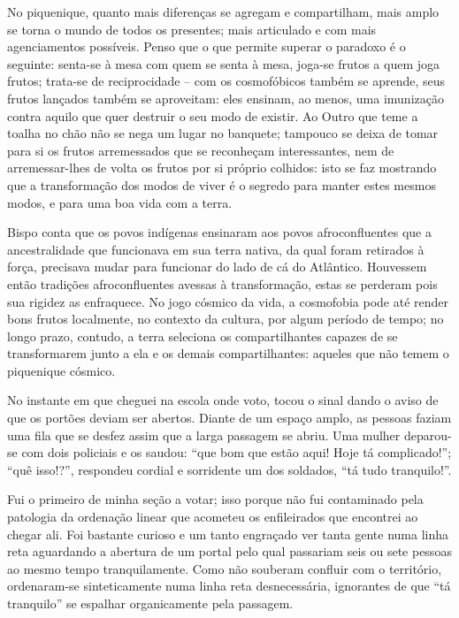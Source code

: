 No piquenique, quanto mais diferenças se agregam e compartilham, mais amplo se torna o mundo de todos os presentes; mais articulado e com mais agenciamentos possíveis. Penso que o que permite superar o paradoxo é o seguinte: senta-se à mesa com quem se senta à mesa, joga-se frutos a quem joga frutos; trata-se de reciprocidade -- com os cosmofóbicos também se aprende, seus frutos lançados também se aproveitam: eles ensinam, ao menos, uma imunização contra aquilo que quer destruir o seu modo de existir. Ao Outro que teme a toalha no chão não se nega um lugar no banquete; tampouco se deixa de tomar para si os frutos arremessados que se reconheçam interessantes, nem de arremessar-lhes de volta os frutos por si próprio colhidos: isto se faz mostrando que a transformação dos modos de viver é o segredo para manter estes mesmos modos, e para uma boa vida com a terra.

Bispo conta que os povos indígenas ensinaram aos povos afroconfluentes que a ancestralidade que funcionava em sua terra nativa, da qual foram retirados à força, precisava mudar para funcionar do lado de cá do Atlântico. Houvessem então tradições afroconfluentes avessas à transformação, estas se perderam pois sua rigidez as enfraquece. No jogo cósmico da vida, a cosmofobia pode até render bons frutos localmente, no contexto da cultura, por algum período de tempo; no longo prazo, contudo, a terra seleciona os compartilhantes capazes de se transformarem junto a ela e os demais compartilhantes: aqueles que não temem o piquenique cósmico.


No instante em que cheguei na escola onde voto, tocou o sinal dando o aviso de que os portões deviam ser abertos. Diante de um espaço amplo, as pessoas faziam uma fila que se desfez assim que a larga passagem se abriu. Uma mulher deparou-se com dois policiais e os saudou: \enquote{que bom que estão aqui! Hoje tá complicado!}; \enquote{quê isso!?}, respondeu cordial e sorridente um dos soldados, \enquote{tá tudo tranquilo!}.

Fui o primeiro de minha seção a votar; isso porque não fui contaminado pela patologia da ordenação linear que acometeu os enfileirados que encontrei ao chegar ali. Foi bastante curioso e um tanto engraçado ver tanta gente numa linha reta aguardando a abertura de um portal pelo qual passariam seis ou sete pessoas ao mesmo tempo tranquilamente. Como não souberam confluir com o território, ordenaram-se sinteticamente numa linha reta desnecessária, ignorantes de que \enquote{tá tranquilo} se espalhar organicamente pela passagem.

